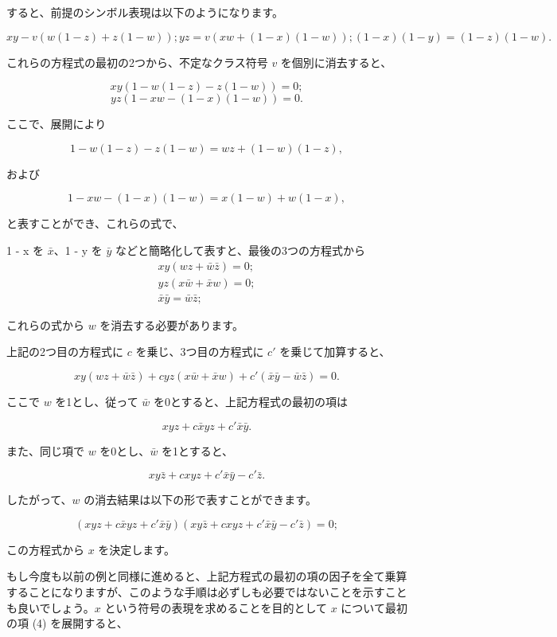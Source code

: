 \documentclass[a4paper,11pt,openany]{ltjsbook}
\begin{document}
すると、前提のシンボル表現は以下のようになります。

\[
xy - v (w(1 - z) + z (1 - w));
yz = v (xw + (1 - x ) (1 - w));
(1-x)(1-y)=(1-z)(1-w).
\]

これらの方程式の最初の2つから、不定なクラス符号 \(v\) を個別に消去すると、

\[
xy (1 - w (1 - z) - z (1 - w)) = 0;
\]
\[
yz (1 - xw - (1 - x)(1 - w)) = 0.
\]

ここで、展開により

\[
1 - w(1 - z) - z(1 - w) = wz + (1 - w)(1 - z),
\]

および

\[
1 - xw - (1 - x) ( 1 - w) = x(1 - w) + w(1 - x),
\]

と表すことができ、これらの式で、

1 - x を $\bar{x}$、1 - y を $\bar{y}$ などと簡略化して表すと、最後の3つの方程式から
\setcounter{equation}{0}
\begin{eqnarray}
xy (wz + \bar{w}\bar{z}) = 0; \\
yz (x\bar{w} + \bar{x}w) = 0; \\
\bar{x}\bar{y} = \bar{w}\bar{z};
\end{eqnarray}

これらの式から \(w\) を消去する必要があります。

上記の2つ目の方程式に \(c\) を乗じ、3つ目の方程式に \(c'\) を乗じて加算すると、

\[
xy (wz + \bar{w}\bar{z}) + cyz (x\bar{w} + \bar{x}w) + c'(\bar{x}\bar{y} - \bar{w}\bar{z}) = 0.
\]

ここで \(w\) を1とし、従って \(\bar{w}\) を0とすると、上記方程式の最初の項は

\[
xyz + c\bar{x}yz + c'\bar{x}\bar{y}.
\]

また、同じ項で \(w\) を0とし、\(\bar{w}\) を1とすると、

\[
xy\bar{z} + cxyz + c'\bar{x}\bar{y} - c'\bar{z}.
\]

したがって、\(w\) の消去結果は以下の形で表すことができます。

\begin{equation}
(xyz + c\bar{x}yz + c'\bar{x}\bar{y}) (xy\bar{z} + cxyz + c'\bar{x}\bar{y} - c'\bar{z}) = 0;
\end{equation}

この方程式から \(x\) を決定します。

もし今度も以前の例と同様に進めると、上記方程式の最初の項の因子を全て乗算することになりますが、このような手順は必ずしも必要ではないことを示すことも良いでしょう。$x$ という符号の表現を求めることを目的として $x$ について最初の項 (4) を展開すると、
\end{document}
